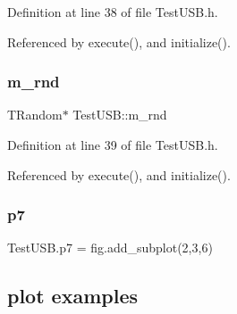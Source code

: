 Definition at line 38 of file Test\+U\+S\+B.\+h.



Referenced by execute(), and initialize().

\mbox{\label{classTestUSB_ac3ad0c22af51e67455f919474a658dbe}} 
\subsubsection{\texorpdfstring{m\+\_\+rnd}{m\_rnd}}
{\footnotesize\ttfamily T\+Random$\ast$ Test\+U\+S\+B\+::m\+\_\+rnd\hspace{0.3cm}{\ttfamily [private]}}



Definition at line 39 of file Test\+U\+S\+B.\+h.



Referenced by execute(), and initialize().

\mbox{\label{classTestUSB_a5d9d8c12d838c12bcbd809011e07982f}} 
\subsubsection{\texorpdfstring{p7}{p7}}
{\footnotesize\ttfamily Test\+U\+S\+B.\+p7 = fig.\+add\+\_\+subplot(2,3,6)}



\subsection*{plot examples}

